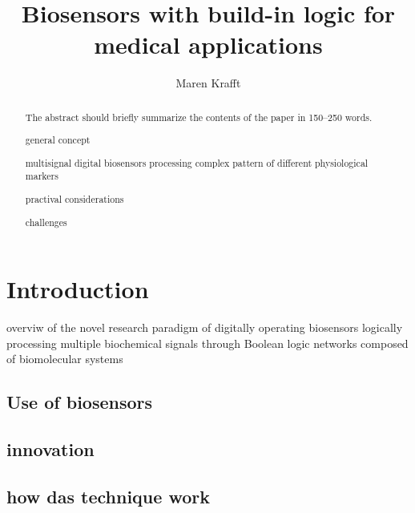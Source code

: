 \documentclass[runningheads]{llncs}
\begin{document}
\title{Biosensors with build-in logic for medical applications}
\author{Maren Krafft}
\maketitle        

      
\begin{abstract}
The abstract should briefly summarize the contents of the paper in
150--250 words.

\item general concept 
\item multisignal digital biosensors processing complex pattern of different physiological markers
\item practival considerations
\item challenges


\end{abstract}

\section{Introduction}

	overviw of the novel research paradigm of digitally operating biosensors logically processing multiple biochemical signals through Boolean logic networks composed of biomolecular systems 
\subsection{Use of biosensors}
\subsection{innovation}
\subsection{how das technique work}



\end{document}
